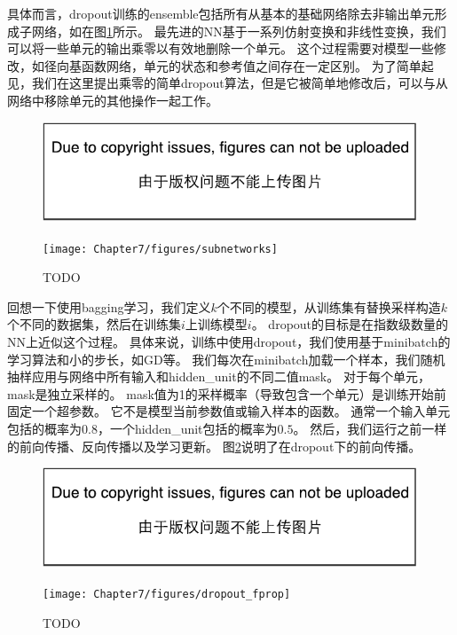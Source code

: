 具体而言，\gls{dropout}训练的\gls{ensemble}包括所有从基本的基础网络除去非输出单元形成子网络，如在图\ref{fig:chap7_subnetworks}所示。
最先进的\gls{NN}基于一系列仿射变换和非线性变换，我们可以将一些单元的输出乘零以有效地删除一个单元。
这个过程需要对模型一些修改，如径向基函数网络，单元的状态和参考值之间存在一定区别。
为了简单起见，我们在这里提出乘零的简单\gls{dropout}算法，但是它被简单地修改后，可以与从网络中移除单元的其他操作一起工作。
\begin{figure}[!htb]
\ifOpenSource
\centerline{\includegraphics{figure.pdf}}
\else
\centerline{\texttt{[image: Chapter7/figures/subnetworks]}}
\fi
\caption{TODO}
\label{fig:chap7_subnetworks}
\end{figure}


回想一下使用\gls{bagging}学习，我们定义$k$个不同的模型，从训练集有替换采样构造$k$个不同的数据集，然后在训练集$i$上训练模型$i$。
\gls{dropout}的目标是在指数级数量的\gls{NN}上近似这个过程。
具体来说，训练中使用\gls{dropout}，我们使用基于\gls{minibatch}的学习算法和小的步长，如\gls{GD}等。
我们每次在\gls{minibatch}加载一个样本，我们随机抽样应用与网络中所有输入和\gls{hidden_unit}的不同二值\gls{mask}。
对于每个单元，\gls{mask}是独立采样的。
\gls{mask}值为1的采样概率（导致包含一个单元）是训练开始前固定一个超参数。
它不是模型当前参数值或输入样本的函数。
通常一个输入单元包括的概率为$0.8$，一个\gls{hidden_unit}包括的概率为$0.5$。
然后，我们运行之前一样的前向传播、反向传播以及学习更新。
图\ref{fig:chap7_dropout_fprop}说明了在\gls{dropout}下的前向传播。
\begin{figure}[!htb]
\ifOpenSource
\centerline{\includegraphics{figure.pdf}}
\else
\centerline{\texttt{[image: Chapter7/figures/dropout\_fprop]}}
\fi
\caption{TODO}
\label{fig:chap7_dropout_fprop}
\end{figure}

